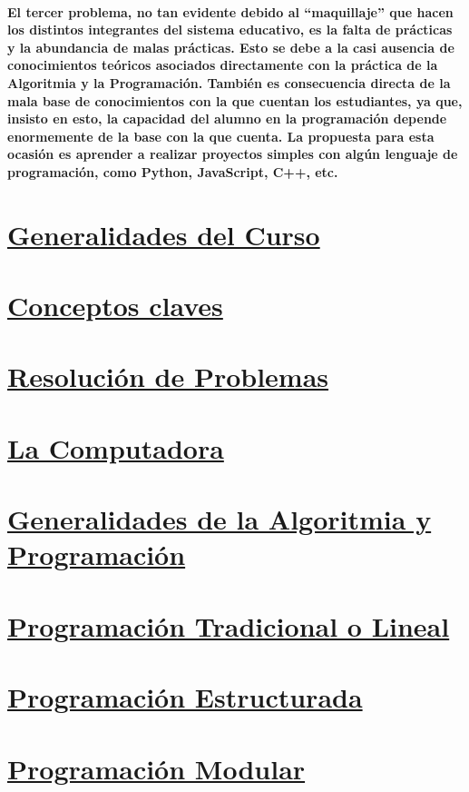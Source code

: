 \documentclass[a4paper, 12pt]{article}
\begin{document}
    \paragraph{
        El tercer problema, no tan evidente debido al ``maquillaje'' que hacen los distintos integrantes del sistema educativo, es la falta 
        de prácticas y la abundancia de malas prácticas. Esto se debe a la casi ausencia de conocimientos teóricos asociados directamente 
        con la práctica de la Algoritmia y la Programación. También es consecuencia directa de la mala base de conocimientos con la que 
        cuentan los estudiantes, ya que, insisto en esto, la capacidad del alumno en la programación depende enormemente de la base con la 
        que cuenta. La propuesta para esta ocasión es aprender a realizar proyectos simples con algún lenguaje de programación, como 
        Python, JavaScript, C++, etc.
    }
    \newpage\section*{\textbf{\underline{Generalidades del Curso}}}
    \newpage\section*{\textbf{\underline{Conceptos claves}}}
    \newpage\section*{\textbf{\underline{Resolución de Problemas}}}
    \newpage\section*{\textbf{\underline{La Computadora}}}
    \newpage\section*{\textbf{\underline{Generalidades de la Algoritmia y Programación}}}
    \newpage\section*{\textbf{\underline{Programación Tradicional o Lineal}}}
    \newpage\section*{\textbf{\underline{Programación Estructurada}}}
    \newpage\section*{\textbf{\underline{Programación Modular}}}
\end{document}
